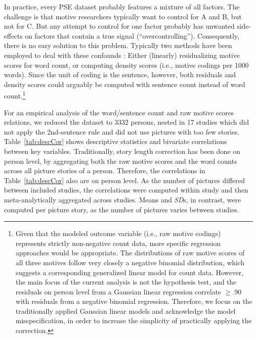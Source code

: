 \documentclass[man,a4paper,mask]{apa6}\usepackage[]{graphicx}\usepackage[]{color}
\begin{document}
In practice, every PSE dataset probably features a mixture of all factors. The challenge is that motive researchers typically want to control for A and B, but not for C. But any attempt to control for one factor probably has unwanted side-effects on factors that contain a true signal (``overcontrolling''). Consequently, there is no easy solution to this problem. Typically two methods have been employed to deal with these confounds \parencite{schultheiss_MeasuringImplicitMotives_2007}: Either (linearly) residualizing motive scores for word count, or computing density scores (i.e., motive codings per 1000 words). Since the unit of coding is the sentence, however, both residuals and density scores could arguably be computed with sentence count instead of word count.\footnote{Given that the modeled outcome variable (i.e., raw motive codings) represents strictly non-negative count data, more specific regression approaches would be appropriate. The distributions of raw motive scores of all three motives follow very closely a negative binomial distribution, which suggests a corresponding generalized linear model for count data. However, the main focus of the current analysis is not the hypothesis test, and the residuals on person level from a Gaussian linear regression correlate $\geq .90$ with residuals from a negative binomial regression. Therefore, we focus on the traditionally applied Gaussian linear models and acknowledge the model misspecification, in order to increase the simplicity of practically applying the correction.}

For an empirical analysis of the word/sentence count and raw motive scores relations, we reduced the dataset to 3332 persons, nested in 17 studies which did not apply the 2nd-sentence rule and did not use pictures with too few stories. 
Table~\ref{tab:descCor} shows descriptive statistics and bivariate correlations between key variables. 
Traditionally, story length correction has been done on person level, by aggregating both the raw motive scores and the word counts across all picture stories of a person. 
Therefore, the correlations in Table~\ref{tab:descCor} also are on person level. 
As the number of pictures differed between included studies, the correlations were computed within study and then meta-analytically aggregated across studies. Means and \emph{SD}s, in contrast, were computed per picture story, as the number of pictures varies between studies. 
\end{document}
